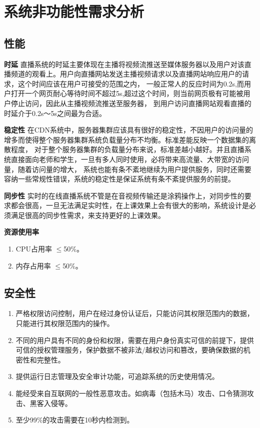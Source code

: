 \section{系统非功能性需求分析}
\subsection{性能}

\textbf{时延}
直播系统的时延主要体现在主播将视频流推送至媒体服务器以及用户对该直播频道的观看上。用户向直播网站发送主播视频请求以及直播网站响应用户的请求，这个时间应该在用户可接受的范围之内，
一般正常人的反应时间为0.2s,而用户打开一个网页耐心等待时间不超过5s,超过这个时间，则当前网页极有可能被用户停止访问，因此从主播视频流推送至服务器，
到用户访问直播网站观看直播的时延介于0.2s〜5s之间最为合适。

\textbf{稳定性}
在CDN系统中，服务器集群应该具有很好的稳定性，不因用户的访问量的增多而使得整个服务器集群系统负载量分布不均衡。标准差能反映一个数据集的离散程度，
对于整个服务器集群的负载量分布来说，标准差越小越好。并且直播系统直接面向老师和学生，一旦有多人同时使用，必将带来高流量、大带宽的访问量，随着访问量的增大，
系统也能有条不紊地继续为用户提供服务，同时还需要容纳一些常规性错误，系统的稳定性是保证系统有条不紊提供服务的前提。

\textbf{同步性}
实时的在线直播系统不管是在音视频传输还是涂鸦操作上，对同步性的要求都会很高，一旦无法满足实时性，在上课效果上会有很大的影响，系统设计是必须满足很高的同步性需求，来支持更好的上课效果。

\textbf{资源使用率}
\begin{enumerate}
\item CPU占用率 $\leq$50\%。
\item 内存占用率 $\leq$50\%。
\end{enumerate}

\subsection{安全性}
\begin{enumerate}
\item 严格权限访问控制，用户在经过身份认证后，只能访问其权限范围内的数据，只能进行其权限范围内的操作。
\item 不同的用户具有不同的身份和权限，需要在用户身份真实可信的前提下，提供可信的授权管理服务，保护数据不被非法/越权访问和篡改，要确保数据的机密性和完整性。
\item 提供运行日志管理及安全审计功能，可追踪系统的历史使用情况。
\item 能经受来自互联网的一般性恶意攻击。如病毒（包括木马）攻击、口令猜测攻击、黑客入侵等。
\item 至少99\%的攻击需要在10秒内检测到。
\end{enumerate}

